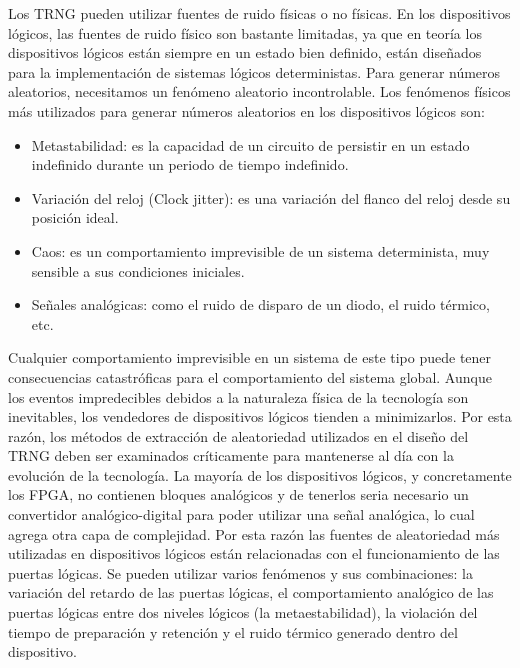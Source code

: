 	
	Los TRNG pueden utilizar fuentes de ruido físicas o no físicas. En los dispositivos lógicos, las fuentes de ruido físico son bastante limitadas, ya que en teoría los dispositivos lógicos están siempre en un estado bien definido, están diseñados para la implementación de sistemas lógicos deterministas. Para generar números aleatorios, necesitamos un fenómeno aleatorio incontrolable. Los fenómenos físicos más utilizados para generar números aleatorios en los dispositivos lógicos son:
	
	\begin{itemize}[noitemsep]
		\item Metastabilidad: es la capacidad de un circuito de persistir en un estado indefinido durante un periodo de tiempo indefinido.
		
		\item Variación del reloj (Clock jitter): es una variación del flanco del reloj desde su posición ideal.
		
		\item Caos: es un comportamiento imprevisible de un sistema determinista, muy sensible a sus condiciones iniciales.
		
		\item Señales analógicas: como el ruido de disparo de un diodo, el ruido térmico, etc.		
	\end{itemize}		
	
	Cualquier comportamiento imprevisible en un sistema de este tipo puede tener consecuencias catastróficas para el comportamiento del sistema global. Aunque los eventos impredecibles debidos a la naturaleza física de la tecnología son inevitables, los vendedores de dispositivos lógicos tienden a minimizarlos. Por esta razón, los métodos de extracción de aleatoriedad utilizados en el diseño del TRNG deben ser examinados críticamente para mantenerse al día con la evolución de la tecnología. La mayoría de los dispositivos lógicos, y concretamente los FPGA, no contienen bloques analógicos y de tenerlos seria necesario un convertidor analógico-digital para poder utilizar una señal analógica, lo cual agrega otra capa de complejidad. Por esta razón las fuentes de aleatoriedad más utilizadas en dispositivos lógicos están relacionadas con el funcionamiento de las puertas lógicas. Se pueden utilizar varios fenómenos y sus combinaciones: la variación del retardo de las puertas lógicas, el comportamiento analógico de las puertas lógicas entre dos niveles lógicos (la metaestabilidad), la violación del tiempo de preparación y retención y el ruido térmico generado dentro del dispositivo.	
					
